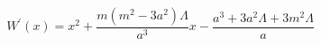 \begin{equation} \label{W46}
W^{\prime}(x)=x^2+\frac{m(m^2-3a^2)\Lambda}{a^3}x-\frac{a^3+3a^2\Lambda+3m^2\Lambda}{a}
\end{equation}


